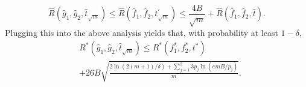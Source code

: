 \documentclass{article}
\begin{document}
\begin{equation*}
\hat{R}(\hat{g}_{1},\hat{g}_{2},\hat{t}_{\sqrt{m}})
\leq \hat{R}(\hat{f}_{1},\hat{f}_{2},t_{\sqrt{m}}^{\prime})
\leq \frac{4 B}{\sqrt{m}} + \hat{R}(\hat{f}_{1},\hat{f}_{2},\hat{t}).
\end{equation*}
Plugging this into the above analysis yields that, with probability at least $1-\delta$,
\begin{align*}
&R^{*}(\hat{g}_{1},\hat{g}_{2},\hat{t}_{\sqrt{m}}) 
\leq  R^{*}(f_{1}^{*},f_{2}^{*},t^{*})\\ &
+ 26 B \sqrt{\frac{2 \ln(2 (m+1)/\delta) + \sum_{j=1}^{2} 3 p_{j} \ln( e m B / p_{j} )}{m}}. 
\end{align*}
\end{document}
